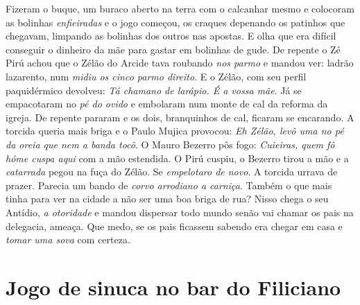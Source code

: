 \documentclass[12pt,brazil,]{book}
\begin{document}
Fizeram o buque, um buraco aberto na terra com o calcanhar mesmo e
colocoram as bolinhas \emph{enfieiradas} e o jogo começou, os craques
depenando os patinhos que chegavam, limpando as bolinhas dos outros nas
apostas. E olha que era difícil conseguir o dinheiro da mãe para gastar
em bolinhas de gude. De repente o Zé Pirú achou que o Zélão do Arcide
tava roubando \emph{nos parmo} e mandou ver: ladrão lazarento, num
\emph{midiu os cinco parmo direito}. E o Zélão, com seu perfil
paquidérmico devolveu: \emph{Tá chamano de larápio. É a vossa mãe}. Já
se empacotaram no \emph{pé do ovido} e embolaram num monte de cal da
reforma da igreja. De repente pararam e os dois, branquinhos de cal,
ficaram se encarando. A torcida queria mais briga e o Paulo Mujica
provocou: \emph{Eh Zélão, levô uma no pé da oreia que nem a banda tocô}.
O Mauro Bezerro pôs fogo: \emph{Cuieiras, quem fô hóme cuspa aqui} com a
mão estendida. O Pirú cuspiu, o Bezerro tirou a mão e a \emph{catarrada}
pegou na fuça do Zélão. Se \emph{empelotaro de novo}. A torcida urrava
de prazer. Parecia um bando de \emph{corvo arrodiano a carniça}. Também
o que mais tinha para ver na cidade a não ser uma boa briga de rua?
Nisso chega o seu Antídio, \emph{a otoridade} e mandou dispersar todo
mundo senão vai chamar os pais na delegacia, ameaça. Que medo, se os
pais ficassem sabendo era chegar em casa e \emph{tomar uma sova} com
certeza.

\section{Jogo de sinuca no bar do
Filiciano}\label{jogo-de-sinuca-no-bar-do-filiciano}
\end{document}
